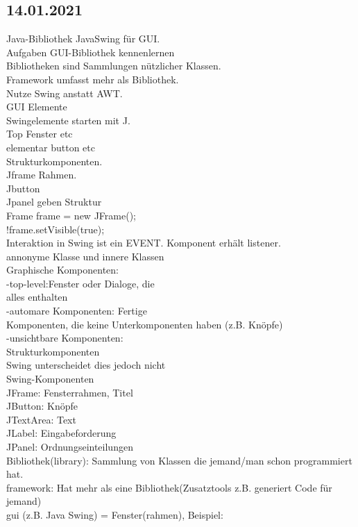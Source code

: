 \documentclass{article}
\begin{document}
	\subsection*{14.01.2021}
	Java-Bibliothek JavaSwing für GUI. \\
	Aufgaben GUI-Bibliothek kennenlernen \\
	Bibliotheken sind Sammlungen nützlicher Klassen. \\
	Framework umfasst mehr als Bibliothek. \\
	Nutze Swing anstatt AWT. \\
	GUI Elemente \\
	Swingelemente starten mit J. \\
	Top Fenster etc \\
	elementar button etc \\
	Strukturkomponenten. \\
	Jframe Rahmen. \\
	Jbutton \\
	Jpanel geben Struktur \\
	Frame frame = new JFrame(); \\
	!frame.setVisible(true); \\
	Interaktion in Swing ist ein EVENT. Komponent erhält listener. \\
	annonyme Klasse und innere Klassen \\
	Graphische Komponenten: \\
	-top-level:Fenster oder Dialoge, die \\ alles enthalten \\
	-automare Komponenten: Fertige \\ Komponenten, die keine Unterkomponenten haben (z.B. Knöpfe) \\
	-unsichtbare Komponenten: \\ Strukturkomponenten \\
	Swing unterscheidet dies jedoch nicht \\
	
	Swing-Komponenten \\
	JFrame: Fensterrahmen, Titel \\
	JButton: Knöpfe \\
	JTextArea: Text \\
	JLabel: Eingabeforderung \\
	JPanel: Ordnungseinteilungen \\
	
	Bibliothek(library): Sammlung von Klassen die jemand/man schon programmiert hat. \\
	framework: Hat mehr als eine Bibliothek(Zusatztools z.B. generiert Code für jemand) \\
	gui (z.B. Java Swing) = Fenster(rahmen), Beispiel: \\
	
\end{document}
